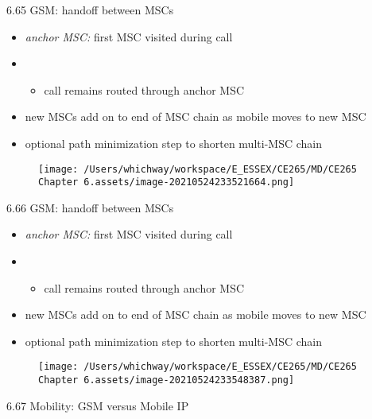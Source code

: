 \documentclass[
]{article}
\begin{document}
6.65 GSM: handoff between MSCs

\begin{itemize}
\item
  \emph{anchor MSC:} first MSC visited during call
\item
  \begin{itemize}
  \item
    call remains routed through anchor MSC
  \end{itemize}
\item
  new MSCs add on to end of MSC chain as mobile moves to new MSC
\item
  optional path minimization step to shorten multi-MSC chain
\end{itemize}

\begin{figure}
\centering
\texttt{[image: /Users/whichway/workspace/E\_ESSEX/CE265/MD/CE265 Chapter 6.assets/image-20210524233521664.png]}
\caption{}
\end{figure}

6.66 GSM: handoff between MSCs

\begin{itemize}
\item
  \emph{anchor MSC:} first MSC visited during call
\item
  \begin{itemize}
  \item
    call remains routed through anchor MSC
  \end{itemize}
\item
  new MSCs add on to end of MSC chain as mobile moves to new MSC
\item
  optional path minimization step to shorten multi-MSC chain
\end{itemize}

\begin{figure}
\centering
\texttt{[image: /Users/whichway/workspace/E\_ESSEX/CE265/MD/CE265 Chapter 6.assets/image-20210524233548387.png]}
\caption{}
\end{figure}

6.67 Mobility: GSM versus Mobile IP
\end{document}
